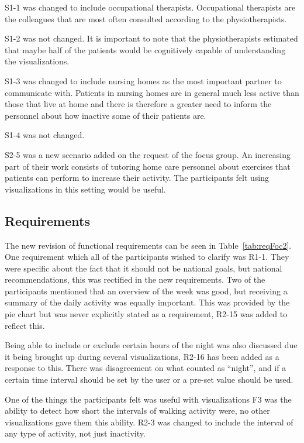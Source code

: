 S1-1 was changed to include occupational therapists. Occupational therapists are the colleagues that are most often consulted according to the physiotherapists. 

S1-2 was not changed. It is important to note that the physiotherapists estimated that maybe half of the patients would be cognitively capable of understanding the visualizations.

S1-3 was changed to include nursing homes as the most important partner to communicate with. Patients in nursing homes are in general much less active than those that live at home and there is therefore a greater need to inform the personnel about how inactive some of their patients are.

S1-4 was not changed.

S2-5 was a new scenario added on the request of the focus group. An increasing part of their work consists of tutoring home care personnel about exercises that patients can perform to increase their activity. The participants felt using visualizations in this setting would be useful. 

\subsection{Requirements}
The new revision of functional requirements can be seen in Table~\ref{tab:reqFoc2}. One requirement which all of the participants wished to clarify was R1-1. They were specific about the fact that it should not be national goals, but national recommendations, this was rectified in the new requirements. Two of the participants mentioned that an overview of the week was good, but receiving a summary of the daily activity was equally important. This was provided by the pie chart but was never explicitly stated as a requirement, R2-15 was added to reflect this.

Being able to include or exclude certain hours of the night was also discussed due it being brought up during several visualizations, R2-16 has been added as a response to this. There was disagreement on what counted as ``night'', and if a certain time interval should be set by the user or a pre-set value should be used. 

One of the things the participants felt was useful with visualizations F3 was the ability to detect how short the intervals of walking activity were, no other visualizations gave them this ability. R2-3 was changed to include the interval of any type of activity, not just inactivity. 

